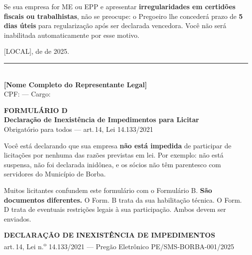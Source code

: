 \documentclass[12pt,a4paper]{article}
\newcommand{\formulario}[3]{%
  \clearpage
  \begin{tcolorbox}[enhanced,colback=navy,colframe=navy,arc=6pt,
    left=14pt,right=14pt,top=10pt,bottom=10pt]
    \color{white}
    {\large\bfseries FORMULÁRIO #1}\\[4pt]
    {\Large\bfseries #2}\\[4pt]
    {\small\color{ltblue} #3}
  \end{tcolorbox}
  \vspace{0.3cm}}
\newcommand{\art}[1]{art.\,#1}
\newcommand{\blank}[1]{\underline{\hspace{#1}}}
\newcommand{\editalRef}{PE/SMS-BORBA-001/2025}
\newcommand{\exercicio}{2025}
\begin{document}
\begin{atencaobox}
\small
Se sua empresa for ME ou EPP e apresentar \textbf{irregularidades em certidões
fiscais ou trabalhistas}, não se preocupe: o Pregoeiro lhe concederá prazo de
\textbf{5 dias úteis} para regularização após ser declarada vencedora. Você não
será inabilitada automaticamente por esse motivo.
\end{atencaobox}

\vspace{1.2cm}
\begin{center}
  [LOCAL], \blank{0.8cm} de \blank{3cm} de \exercicio.\\[1.0cm]
  \rule{9cm}{0.5pt}\\[3pt]
  \textbf{[Nome Completo do Representante Legal]}\\
  \small CPF: \blank{3cm} --- Cargo: \blank{3cm}
\end{center}

\formulario{D}{Declaração de Inexistência de Impedimentos para Licitar}{%
  Obrigatório para todos --- art.\,14, Lei 14.133/2021}

\begin{dicabox}
\small
Você está declarando que sua empresa \textbf{não está impedida} de participar
de licitações por nenhuma das razões previstas em lei. Por exemplo: não está
suspensa, não foi declarada inidônea, e os sócios não têm parentesco com servidores
do Município de Borba.
\end{dicabox}

\begin{errobox}
\small
Muitos licitantes confundem este formulário com o Formulário B. \textbf{São
documentos diferentes.} O Form. B trata da sua habilitação técnica. O Form. D
trata de eventuais restrições legais à sua participação. Ambos devem ser
enviados.
\end{errobox}

\vspace{0.3cm}
\begin{fillbox}
\begin{center}
  {\bfseries\color{navy}DECLARAÇÃO DE INEXISTÊNCIA DE IMPEDIMENTOS}\\[4pt]
  {\small \art{14}, Lei n.\textsuperscript{o} 14.133/2021 ---
    Pregão Eletrônico \editalRef}
\end{center}
\end{fillbox}
\end{document}
